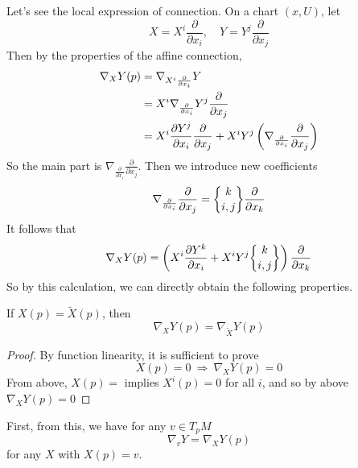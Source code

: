 \noindent Let's see the local expression of connection. On a chart $(x,U)$, let
\begin{equation*}
	X = X^i \frac{\partial}{\partial x_i},\quad Y = Y^j \frac{\partial}{\partial x_j}
\end{equation*}
Then by the properties of the affine connection,
\begin{equation*}
	\begin{aligned}
		\nabla_XY(p) &= \nabla_{X^i \frac{\partial}{\partial x_i}}Y \\
		&= X^i \nabla_{\frac{\partial}{\partial x_i}}Y^j \frac{\partial}{\partial x_j} \\
		&= X^i \frac{\partial Y^j}{\partial x_i}\frac{\partial}{\partial x_j}+X^iY^j\left(\nabla_{\frac{\partial}{\partial x_i}}\frac{\partial}{\partial x_j}\right)
	\end{aligned}
\end{equation*}
So the main part is $\nabla_{\frac{\partial}{\partial x_i}}\frac{\partial}{\partial x_j}$. Then we introduce new coefficients
\begin{equation*}
	\nabla_{\frac{\partial}{\partial x_i}}\frac{\partial}{\partial x_j} = \bracenom{k}{i,j}\frac{\partial}{\partial x_k}
\end{equation*}
It follows that
\begin{equation*}
	\nabla_XY(p) = \bc{X^i\frac{\partial Y^k}{\partial x_i}+X^iY^j\bracenom{k}{i,j}}\frac{\partial}{\partial x_k}
\end{equation*}
So by this calculation, we can directly obtain the following properties.
\begin{prop}
	If $X(p) = \tilde{X}(p)$, then
	\begin{equation*}
		\nabla_XY(p) = \nabla_{\tilde{X}}Y(p)
	\end{equation*}
\end{prop}
\begin{proof}
	By function linearity, it is sufficient to prove
	\begin{equation*}
		X(p) = 0 ~\Rightarrow~ \nabla_XY(p) = 0
	\end{equation*}
	From above, $X(p) = $ implies $X^i(p) = 0$ for all $i$, and so by above $\nabla_XY(p) = 0$
\end{proof}
\begin{rmk}
	First, from this, we have for any $v \in T_pM$
	\begin{equation*}
		\nabla_vY = \nabla_{X}Y(p)
	\end{equation*}
	for any $X$ with $X(p) = v$.
\end{rmk}

